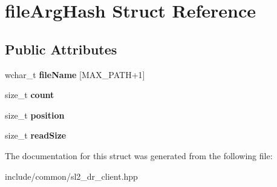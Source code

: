 \hypertarget{structfile_arg_hash}{}\section{file\+Arg\+Hash Struct Reference}
\label{structfile_arg_hash}
\subsection*{Public Attributes}
\begin{DoxyCompactItemize}
\item 
\mbox{\label{structfile_arg_hash_a1eabc60dbb7a634a88f13b175aec574d}} 
wchar\+\_\+t {\bfseries file\+Name} \mbox{[}M\+A\+X\+\_\+\+P\+A\+TH+1\mbox{]}
\item 
\mbox{\label{structfile_arg_hash_adeffcf39d1ec9283701ea48690a3cb19}} 
size\+\_\+t {\bfseries count}
\item 
\mbox{\label{structfile_arg_hash_a99a7cac236949a13999c774c059b2ee4}} 
size\+\_\+t {\bfseries position}
\item 
\mbox{\label{structfile_arg_hash_a9c95e97a8ab9988b0df00e9ad5381c4a}} 
size\+\_\+t {\bfseries read\+Size}
\end{DoxyCompactItemize}


The documentation for this struct was generated from the following file\+:\begin{DoxyCompactItemize}
\item 
include/common/sl2\+\_\+dr\+\_\+client.\+hpp\end{DoxyCompactItemize}
